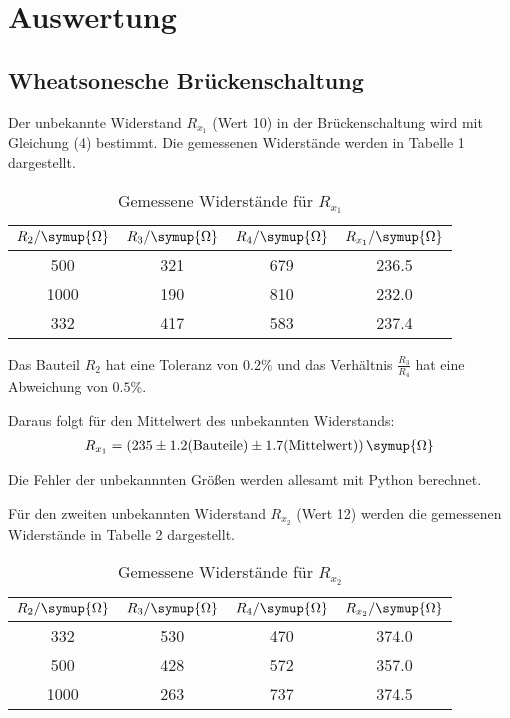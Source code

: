 \section{Auswertung}
\label{sec:Auswertung}

\subsection{Wheatsonesche Brückenschaltung}
Der unbekannte Widerstand $R_{x_1}$ (Wert 10) in der Brückenschaltung wird mit Gleichung (4) bestimmt. Die gemessenen Widerstände
werden in Tabelle 1 dargestellt.

\begin{table}[H]
  \centering
  \caption{Gemessene Widerstände für $R_{x_1}$}
  \label{tab:Widerstand}
  \begin{tabular}{c c c c}
    \toprule
    $R_2/ \symup{\Omega}$ & $R_3/ \symup{\Omega}$ & $R_4 / \symup{\Omega}$ & $R_{x_1}/ \symup{\Omega}$\\
    \midrule
     500  &  321 & 679  &  236.5 \\
    1000  &  190 & 810  &  232.0  \\
     332  &  417 & 583  &  237.4  \\
    \bottomrule
  \end{tabular}
\end{table}



Das Bauteil $R_2$ hat eine Toleranz von $0.2\%$ und das Verhältnis $\frac{R_3}{R_4}$ hat eine Abweichung von
$0.5\%$.

Daraus folgt für den Mittelwert  des unbekannten Widerstands:
\begin{align*}
  R_{x_1} = (235 \pm 1.2\text{(Bauteile)} \pm 1.7\text{(Mittelwert)}) \, \symup{\Omega}
\end{align*}

Die Fehler der unbekannnten Größen werden allesamt mit Python berechnet.

Für den zweiten unbekannten Widerstand $R_{x_2}$ (Wert 12) werden die gemessenen Widerstände in Tabelle 2 dargestellt.

\begin{table}[H]
  \centering
  \caption{Gemessene Widerstände für $R_{x_2}$}
  \label{tab:Widerstand}
  \begin{tabular}{c c c c}
    \toprule
    $R_2/ \symup{\Omega}$ & $R_3/ \symup{\Omega}$ & $R_4 / \symup{\Omega}$ & $R_{x_2}/ \symup{\Omega}$ \\
    \midrule
      332  &  530 & 470 & 374.0 \\
      500  &  428 & 572 & 357.0  \\
     1000  &  263 & 737 & 374.5  \\
    \bottomrule
  \end{tabular}
\end{table}

